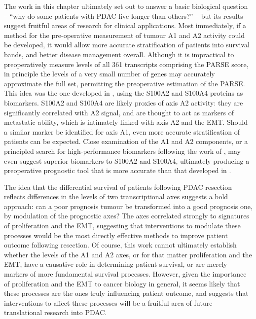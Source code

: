 \documentclass[dissertation.tex]{subfiles}
\begin{document}
The work in this chapter ultimately set out to answer a basic biological question  -- ``why do some patients with \gls{PDAC} live longer than others?'' -- but its results suggest fruitful areas of research for clinical applications.  Most immediately, if a method for the pre-operative measurement of tumour A1 and A2 activity could be developed, it would allow more accurate stratification of patients into survival bands, and better disease management overall.  Although it is impractical to preoperatively measure levels of all 361 transcripts comprising the \gls{PARSE} score, in principle the levels of a very small number of genes may accurately approximate the full set, permitting the preoperative estimation of the \gls{PARSE}.  This idea was the one developed in , using the S100A2 and S100A4 proteins as biomarkers.  S100A2 and S100A4 are likely proxies of axis A2 activity: they are significantly correlated with A2 signal, and are thought to act as markers of metastatic ability, which is intimately linked with axis A2 and the \gls{EMT}.  Should a similar marker be identified for axis A1, even more accurate stratification of patients can be expected.  Close examination of the A1 and A2 components, or a principled search for high-performance biomarkers following the work of , may even suggest superior biomarkers to S100A2 and S100A4, ultimately producing a preoperative prognostic tool that is more accurate than that developed in .

The idea that the differential survival of patients following \gls{PDAC} resection reflects differences in the levels of two transcriptional axes suggests a bold approach: can a poor prognosis tumour be transformed into a good prognosis one, by modulation of the prognostic axes?  The axes correlated strongly to signatures of proliferation and the \gls{EMT}, suggesting that interventions to modulate these processes would be the most directly effective methods to improve patient outcome following resection.  Of course, this work cannot ultimately establish whether the levels of the A1 and A2 axes, or for that matter proliferation and the \gls{EMT}, have a causative role in determining patient survival, or are merely markers of more fundamental survival processes.  However, given the importance of proliferation and the \gls{EMT} to cancer biology in general, it seems likely that these processes are the ones truly influencing patient outcome, and suggests that interventions to affect these processes will be a fruitful area of future translational research into \gls{PDAC}.
\end{document}
